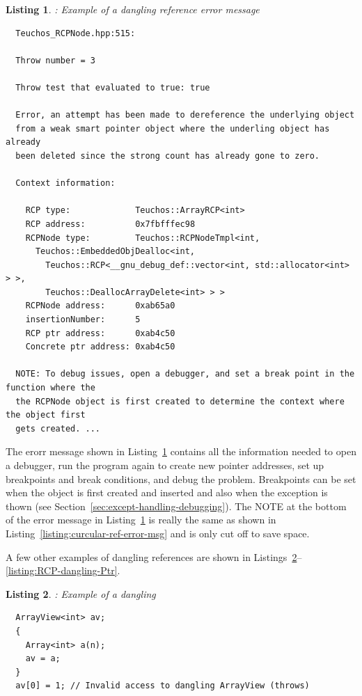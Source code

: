 \documentclass[pdf,ps2pdf,11pt]{SANDreport}
\newtheorem{listing}{Listing}
\begin{document}
\begin{listing}: Example of a dangling reference error message \\
\label{listing:dangling-ref-error-msg}
{\small\begin{verbatim}
  Teuchos_RCPNode.hpp:515:
  
  Throw number = 3
  
  Throw test that evaluated to true: true
  
  Error, an attempt has been made to dereference the underlying object
  from a weak smart pointer object where the underling object has already
  been deleted since the strong count has already gone to zero.
  
  Context information:
  
    RCP type:             Teuchos::ArrayRCP<int>
    RCP address:          0x7fbfffec98
    RCPNode type:         Teuchos::RCPNodeTmpl<int,
      Teuchos::EmbeddedObjDealloc<int,
        Teuchos::RCP<__gnu_debug_def::vector<int, std::allocator<int> > >,
        Teuchos::DeallocArrayDelete<int> > >
    RCPNode address:      0xab65a0
    insertionNumber:      5
    RCP ptr address:      0xab4c50
    Concrete ptr address: 0xab4c50
  
  NOTE: To debug issues, open a debugger, and set a break point in the function where the
  the RCPNode object is first created to determine the context where the object first
  gets created. ...
\end{verbatim}}
\end{listing}

The erorr message shown in
Listing~\ref{listing:dangling-ref-error-msg} contains all the
information needed to open a debugger, run the program again to create
new pointer addresses, set up breakpoints and break conditions, and
debug the problem.  Breakpoints can be set when the {}
object is first created and inserted and also when the exception is
thown (see Section~\ref{sec:except-handling-debugging}).  The NOTE at
the bottom of the error message in
Listing~\ref{listing:dangling-ref-error-msg} is really the same as
shown in Listing~\ref{listing:curcular-ref-error-msg} and is only cut
off to save space.

A few other examples of dangling references are shown in
Listings~\ref{listing:Array-dangling-ArrayView}--{}\ref{listing:RCP-dangling-Ptr}.

\begin{listing}: Example of a dangling {} \\
\label{listing:Array-dangling-ArrayView}
{\small\begin{verbatim}
  ArrayView<int> av;
  {
    Array<int> a(n);
    av = a;
  }
  av[0] = 1; // Invalid access to dangling ArrayView (throws)
\end{verbatim}}
\end{listing}
\end{document}
